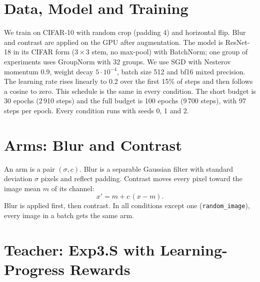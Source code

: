 \documentclass[a4paper,12pt]{report}
\newcommand{\cond}[1]{\texttt{#1}}
\begin{document}
\section{Data, Model and Training}

We train on CIFAR-10 with random crop (padding 4) and horizontal flip. Blur and contrast are applied on the GPU after augmentation. The model is ResNet-18 in its CIFAR form ($3\times3$ stem, no max-pool) with BatchNorm; one group of experiments uses GroupNorm with 32 groups. We use SGD with Nesterov momentum 0.9, weight decay $5\cdot10^{-4}$, batch size 512 and bf16 mixed precision. The learning rate rises linearly to 0.2 over the first 15\% of steps and then follows a cosine to zero. This schedule is the same in every condition. The short budget is 30 epochs (2\,910 steps) and the full budget is 100 epochs (9\,700 steps), with 97 steps per epoch. Every condition runs with seeds 0, 1 and 2.

\section{Arms: Blur and Contrast}

An arm is a pair $(\sigma, c)$. Blur is a separable Gaussian filter with standard deviation $\sigma$ pixels and reflect padding. Contrast moves every pixel toward the image mean $m$ of its channel:
\begin{equation}
x' = m + c\,(x - m).
\end{equation}
Blur is applied first, then contrast. In all conditions except one (\cond{random\_image}), every image in a batch gets the same arm.

\section{Teacher: Exp3.S with Learning-Progress Rewards}
\end{document}

